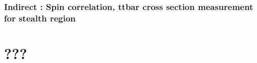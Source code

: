 
        \subsection{Indirect : Spin correlation, ttbar cross section measurement for stealth region}


\chapter{???}
        \loremipsum



        \loremipsum




